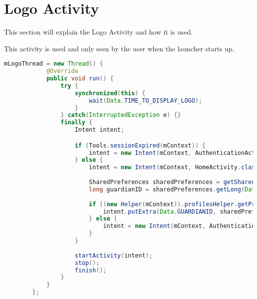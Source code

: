 \section{Logo Activity}
This section will explain the Logo Activity and how it is used.

This activity is used and only seen by the user when the launcher starts up.



\begin{lstlisting}[style=sourceCode, language=JAVA, caption=This is code, label=lst:logoActivity] 
		mLogoThread = new Thread() {
	        @Override
	        public void run() {
	            try {
	            	synchronized(this) {
	            		wait(Data.TIME_TO_DISPLAY_LOGO);
	            	}
	            } catch(InterruptedException e) {}
	            finally {
	            	Intent intent;

	            	if (Tools.sessionExpired(mContext)) {
	            		intent = new Intent(mContext, AuthenticationActivity.class);
	            	} else {
	            		intent = new Intent(mContext, HomeActivity.class);
	            		
	            		SharedPreferences sharedPreferences = getSharedPreferences(Data.TIMERKEY, 0);
	            		long guardianID = sharedPreferences.getLong(Data.GUARDIANID, -1);
	            		
	            		if ((new Helper(mContext)).profilesHelper.getProfileById(guardianID) != null) {
	            			intent.putExtra(Data.GUARDIANID, sharedPreferences.getLong(Data.GUARDIANID, -1));
	            		} else {
	            			intent = new Intent(mContext, AuthenticationActivity.class);
	            		}
	            	}
	            	
	                startActivity(intent);
	                stop();
	                finish();
	            }
	        }
	    };
\end{lstlisting}